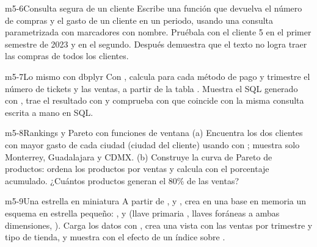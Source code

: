 \begin{ejercicio}{m5-6}{Consulta segura de un cliente}
Escribe una función 
que devuelva el número de compras y el gasto de un cliente en un periodo,
usando una consulta parametrizada con marcadores con nombre. Pruébala con
el cliente 5 en el primer semestre de 2023 y en el segundo. Después
demuestra que el texto  no logra traer las compras de
todos los clientes.
\end{ejercicio}

\begin{ejercicio}{m5-7}{Lo mismo con dbplyr}
Con , calcula para cada método de pago y trimestre el
número de tickets y las ventas, a partir de la tabla .
Muestra el SQL generado con , trae el resultado con
 y comprueba con  que coincide con
la misma consulta escrita a mano en SQL.
\end{ejercicio}

\begin{ejercicio}{m5-8}{Rankings y Pareto con funciones de ventana}
(a) Encuentra los dos clientes con mayor gasto de cada ciudad (ciudad del
cliente) usando  con ; muestra solo
Monterrey, Guadalajara y CDMX. (b) Construye la curva de Pareto de
productos: ordena los productos por ventas y calcula con
 el porcentaje acumulado. ¿Cuántos productos generan el
80\% de las ventas?
\end{ejercicio}

\begin{ejercicio}{m5-9}{Una estrella en miniatura}
A partir de ,  y
, crea en una base en memoria un esquema en estrella
pequeño: ,  y
 (llave primaria , llaves
foráneas a ambas dimensiones, ). Carga los
datos con , crea una vista con las ventas por
trimestre y tipo de tienda, y muestra con  el
efecto de un índice sobre .
\end{ejercicio}

